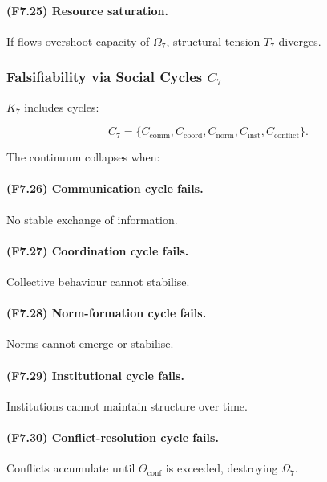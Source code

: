 \paragraph{(F7.25) Resource saturation.}
If flows overshoot capacity of $\Omega_7$,
structural tension $T_7$ diverges.



\subsubsection{Falsifiability via Social Cycles \texorpdfstring{$C_7$}{C_7}}

$K_7$ includes cycles:

\[
C_7 = \{
C_{\mathrm{comm}}, C_{\mathrm{coord}},
C_{\mathrm{norm}}, C_{\mathrm{inst}},
C_{\mathrm{conflict}}
\}.
\]

The continuum collapses when:

\paragraph{(F7.26) Communication cycle fails.}
No stable exchange of information.

\paragraph{(F7.27) Coordination cycle fails.}
Collective behaviour cannot stabilise.

\paragraph{(F7.28) Norm-formation cycle fails.}
Norms cannot emerge or stabilise.

\paragraph{(F7.29) Institutional cycle fails.}
Institutions cannot maintain structure over time.

\paragraph{(F7.30) Conflict-resolution cycle fails.}
Conflicts accumulate until
$\Theta_{\mathrm{conf}}$ is exceeded,
destroying $\Omega_7$.




